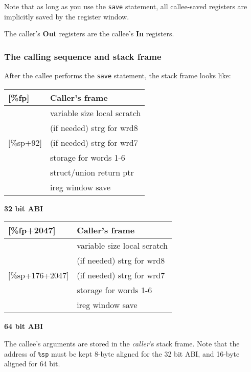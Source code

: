 \documentclass[11pt]{article}
\begin{document}
Note that as long as you use the {\tt save} statement, all callee-saved
registers are implicitly saved by the register window.

The caller's {\bf Out} registers are the callee's {\bf In} registers.

\subsubsection{The calling sequence and stack frame}
After the callee performs the {\tt save} statement, the stack frame looks
like:

\begin{minipage}{2.7in}
\begin{small}
\begin{tabular}{l|l|}
[\%fp]   & Caller's frame \\\hline\hline
         & variable size local scratch \\\hline
         & (if needed) strg for wrd8 \\
$\lbrack$\%sp+92$\rbrack$& (if needed) strg for wrd7 \\\hline
[\%sp+68]& storage for words 1-6 \\\hline
[\%sp+64]& struct/union return ptr\\\hline
[\%sp]   & ireg window save \\\hline
\end{tabular}
\centerline{\bf 32 bit ABI}
\end{small}
\end{minipage}
%
\begin{minipage}{3.0in}
\begin{small}
\begin{tabular}{l|l|}
[\%fp+2047]   & Caller's frame \\\hline\hline
         & variable size local scratch \\\hline
         & (if needed) strg for wrd8 \\
$\lbrack$\%sp+176+2047$\rbrack$& (if needed) strg for wrd7 \\\hline
[\%sp+128+2047]& storage for words 1-6 \\\hline
[\%sp+2047]  & ireg window save \\\hline
\end{tabular}
\centerline{\bf 64 bit ABI}
\end{small}
\end{minipage}

The callee's arguments are stored in the {\em caller}'s stack frame.
Note that the address of {\tt \%sp} must be kept 8-byte aligned for the
32 bit ABI, and 16-byte aligned for 64 bit.  
\end{document}
